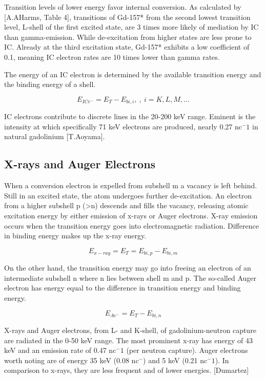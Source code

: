 Transition levels of lower energy favor internal conversion. As calculated by [A.AHarms, Table 4], transitions of Gd-157* from the second lowest transition level, L-shell of the first excited state, are 3 times more likely of mediation by IC than gamma-emission. While de-excitation from higher states are less prone to IC. Already at the third excitation state, Gd-157* exhibits a low coefficient of 0.1, meaning IC electron rates are 10 times lower than gamma rates.

The energy of an IC electron is determined by the available transition energy and the binding energy of a shell.

  \begin{equation}
      E_{ICe^- }=E_T-E_{bi,i},\ , \ i = K, L, M, ...
  \end{equation}

IC electrons contribute to discrete lines in the 20-200 keV range. Eminent is the intensity at which specifically 71 keV electrons are produced, nearly 0.27 nc$^-1$ in natural gadolinium [T.Aoyama].

\subsection{X-rays and Auger Electrons}
When a conversion electron is expelled from subshell m a vacancy is left behind. Still in an excited state, the atom undergoes further de-excitation. An electron from a higher subshell p (>n) descends and fills the vacancy, releasing atomic excitation energy by either emission of x-rays or Auger electrons.
X-ray emission occurs when the transition energy goes into electromagnetic radiation. Difference in binding energy makes up the x-ray energy.

  \begin{equation}
      E_{x-ray} = E_T = E_{bi,p}-E_{bi,m}
  \end{equation}

On the other hand, the transition energy may go into freeing an electron of an intermediate subshell n where n lies between shell m and p. The so-called Auger electron has energy equal to the difference in transition energy and binding energy.

\begin{equation}
    E_{Ae^-} = E_T-E_{bi,n}
\end{equation}

 X-rays and Auger electrons, from L- and K-shell, of gadolinium-neutron capture are radiated in the 0-50 keV range. The most prominent x-ray has energy of 43 keV and an emission rate of 0.47 nc$^-1$ (per neutron capture). Auger electrons worth noting are of energy 35 keV (0.08 nc$^-$) and 5 keV (0.21 nc$^-1$). In comparison to x-rays, they are less frequent and of lower energies. [Dumartez]

